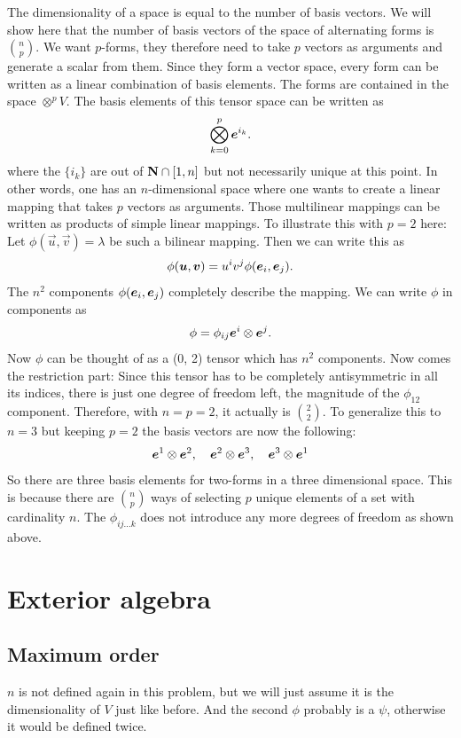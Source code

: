 \documentclass[11pt, english, fleqn, DIV=15, headinclude, BCOR=1cm]{scrartcl}
\begin{document}
The dimensionality of a space is equal to the number of basis vectors. We will
show here that the number of basis vectors of the space of alternating forms is
$\binom np$. We want $p$-forms, they therefore need to take $p$ vectors as
arguments and generate a scalar from them. Since they form a vector space,
every form can be written as a linear combination of basis elements. The forms
are contained in the space $\otimes^p V$. The basis elements of this tensor
space can be
written as
\[
    \bigotimes_{k=0}^p \boldsymbol{e}^{i_k}.
\]
where the $\{i_k\}$ are out of $\mathbf N \cap [1, n]$ but not necessarily unique at
this point. In other words, one has an $n$-dimensional space where one wants to
create a linear mapping that takes $p$ vectors as arguments. Those multilinear
mappings can be written as products of simple linear mappings. To illustrate
this with $p = 2$ here: Let $\phi(\vec u, \vec v) = \lambda$ be such a bilinear
mapping. Then we can write this as
\[
    \phi(\boldsymbol{u}, \boldsymbol{v}) = u^i v^j \phi(\boldsymbol{e}_i, \boldsymbol{e}_j).
\]
The $n^2$ components $\phi(\boldsymbol{e}_i, \boldsymbol{e}_j)$ completely describe the mapping. We
can write $\phi$ in components as
\[
    \phi = \phi_{ij} \boldsymbol{e}^i \otimes \boldsymbol{e}^j.
\]
Now $\phi$ can be thought of as a (0, 2) tensor which has $n^2$ components. Now
comes the restriction part: Since this tensor has to be completely
antisymmetric in all its indices, there is just one degree of freedom left, the
magnitude of the $\phi_{12}$ component. Therefore, with $n = p = 2$, it
actually is $\binom 22$. To generalize this to $n = 3$ but keeping $p = 2$ the
basis vectors are now the following:
\[
    \boldsymbol{e}^1 \otimes \boldsymbol{e}^2
    ,\quad
    \boldsymbol{e}^2 \otimes \boldsymbol{e}^3
    ,\quad
    \boldsymbol{e}^3 \otimes \boldsymbol{e}^1
\]
So there are three basis elements for two-forms in a three dimensional space.
This is because there are $\binom np$ ways of selecting $p$ unique elements of
a set with cardinality $n$. The $\phi_{ij\ldots k}$ does not introduce any more
degrees of freedom as shown above.

\section{Exterior algebra}

\subsection{Maximum order}

\begin{small}
    $n$ is not defined again in this problem, but we will just assume it is the
    dimensionality of $V$ just like before. And the second $\phi$ probably is a
    $\psi$, otherwise it would be defined twice.
\end{small}
\end{document}
